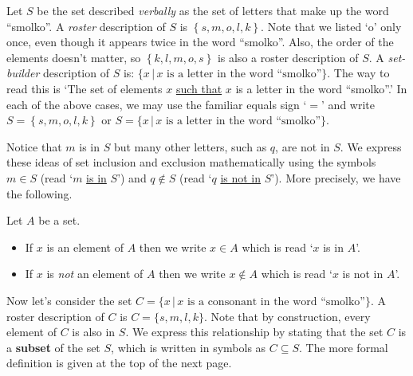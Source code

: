 \documentclass{ximera}
\begin{document}

Let $S$ be the set described \textit{verbally} as the set of letters that make up the word ``smolko''.  A  \emph{roster} description of $S$ is $\left\{ s, m, o, l, k \right\}$. Note that we listed `o' only once, even though it appears twice in the word ``smolko''.  Also, the order of the elements doesn't matter, so $\left\{ k,  l,  m, o, s \right\}$ is also a roster description of $S$.  A \emph{set-builder} description of $S$ is: $\{ x \, | \, \mbox{$x$ is a letter in the word ``smolko''}\}$.  The way to read this is `The set of elements $x$ \underline{such that} $x$ is a letter in the word ``smolko''.'   In each of the above cases, we may use the familiar equals sign `$=$' and write  $S = \left\{ s, m, o, l, k \right\}$ or $S = \{ x \, | \, \mbox{$x$ is a letter in the word ``smolko''}\}$.  

Notice that  $m$ is in $S$ but many other letters, such as $q$, are not in $S$.  We express these ideas of set inclusion and exclusion mathematically using the symbols $m \in S$ (read `$m$ \underline{is in} $S$') and $q \notin S$ (read `$q$ \underline{is not in} $S$').  More precisely, we have the following.


\begin{definition} \label{notationforsetinclusion}  Let $A$ be a set.

\begin{itemize}

\item If $x$ is an element of $A$ then we write $x \in A$\index{$\in$} which is read `$x$ is in $A$'.

\item If $x$ is \emph{not} an element of $A$ then we write $x \notin A$\index{$\notin$} which is read `$x$ is not in $A$'.

\end{itemize}

\end{definition}


 

Now let's consider the set $C =  \{ x \, | \, \mbox{$x$ is a consonant in the word ``smolko''}\}$.  A roster description of $C$ is  $C = \{ s, m, l, k\}$.  Note that by construction, every element of $C$ is also in $S$.  We express this relationship by stating that the set $C$ is a \textbf{subset} of the set $S$, which is written in symbols as $C \subseteq S$.  The more formal definition is given at the top of the next page.
\end{document}
